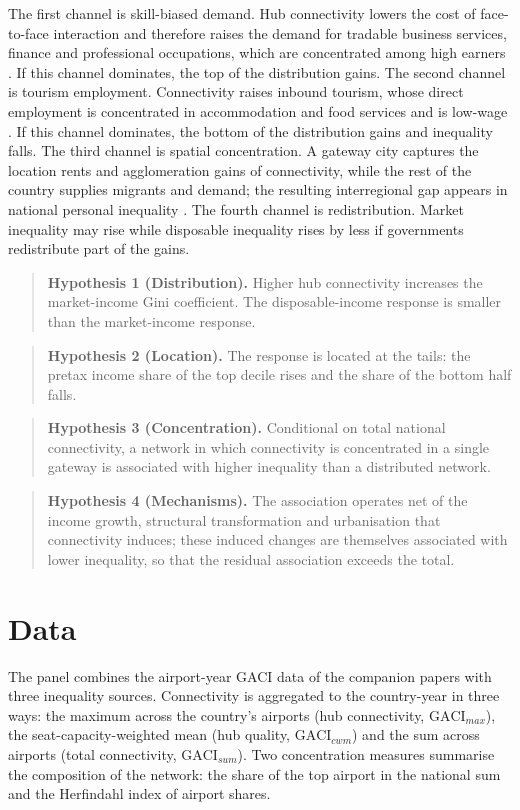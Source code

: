 \documentclass[12pt]{article}
\begin{document}
The first channel is skill-biased demand. Hub connectivity lowers the cost of face-to-face interaction and therefore raises the demand for tradable business services, finance and professional occupations, which are concentrated among high earners \citep{Allen_2014,Brueckner_2003}. If this channel dominates, the top of the distribution gains. The second channel is tourism employment. Connectivity raises inbound tourism, whose direct employment is concentrated in accommodation and food services and is low-wage \citep{Khadaroo_2008}. If this channel dominates, the bottom of the distribution gains and inequality falls. The third channel is spatial concentration. A gateway city captures the location rents and agglomeration gains of connectivity, while the rest of the country supplies migrants and demand; the resulting interregional gap appears in national personal inequality \citep{Redding_2004}. The fourth channel is redistribution. Market inequality may rise while disposable inequality rises by less if governments redistribute part of the gains.

\begin{quote}
\textbf{Hypothesis 1 (Distribution).} Higher hub connectivity increases the market-income Gini coefficient. The disposable-income response is smaller than the market-income response.
\end{quote}
\begin{quote}
\textbf{Hypothesis 2 (Location).} The response is located at the tails: the pretax income share of the top decile rises and the share of the bottom half falls.
\end{quote}
\begin{quote}
\textbf{Hypothesis 3 (Concentration).} Conditional on total national connectivity, a network in which connectivity is concentrated in a single gateway is associated with higher inequality than a distributed network.
\end{quote}
\begin{quote}
\textbf{Hypothesis 4 (Mechanisms).} The association operates net of the income growth, structural transformation and urbanisation that connectivity induces; these induced changes are themselves associated with lower inequality, so that the residual association exceeds the total.
\end{quote}

\section{Data}
\label{sec:data}
The panel combines the airport-year GACI data of the companion papers with three inequality sources. Connectivity is aggregated to the country-year in three ways: the maximum across the country's airports (hub connectivity, $\mathrm{GACI}_{max}$), the seat-capacity-weighted mean (hub quality, $\mathrm{GACI}_{cwm}$) and the sum across airports (total connectivity, $\mathrm{GACI}_{sum}$). Two concentration measures summarise the composition of the network: the share of the top airport in the national sum and the Herfindahl index of airport shares.
\end{document}

